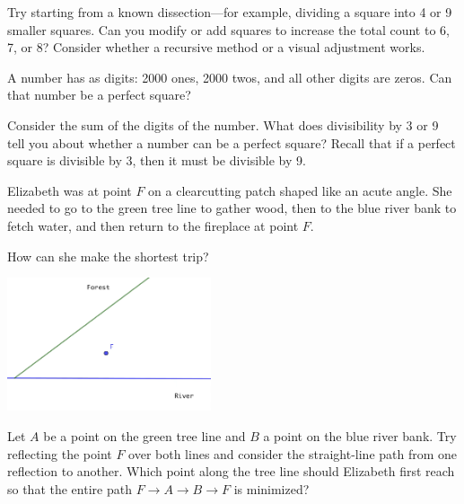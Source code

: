 \documentclass{article}
\begin{document}
\begin{hint*}
    Try starting from a known dissection—for example, dividing a square into 4 or 9 smaller squares. Can you modify or add squares to increase the total count to 6, 7, or 8? Consider whether a recursive method or a visual adjustment works.
\end{hint*}

\begin{exercise}\label{example:digit-sum-perfect-square}
    A number has as digits: 2000 ones, 2000 twos, and all other digits are zeros.  
    Can that number be a perfect square?
      
\end{exercise}

\begin{hint*}
    Consider the sum of the digits of the number. What does divisibility by 3 or 9 tell you about whether a number can be a perfect square? Recall that if a perfect square is divisible by 3, then it must be divisible by 9.
\end{hint*}

\begin{exercise}\label{example:shortest-path-reflection}
    Elizabeth was at point \( F \) on a clearcutting patch shaped like an acute angle.  
    She needed to go to the green tree line to gather wood, then to the blue river bank to fetch water, and then return to the fireplace at point \( F \).  

    How can she make the shortest trip?
      
\end{exercise}

\begin{center}
    \includegraphics[width=6cm]{./png/elizabeth-2.png}
\end{center}

\begin{hint*}
    Let \( A \) be a point on the green tree line and \( B \) a point on the blue river bank.  
    Try reflecting the point \( F \) over both lines and consider the straight-line path from one reflection to another.  
    Which point along the tree line should Elizabeth first reach so that the entire path \( F \to A \to B \to F \) is minimized?
\end{hint*}
\end{document}
